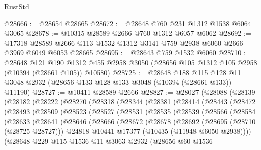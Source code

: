 \begin{lexlean}{RustStd}
\begin{coremodule}
@28666 := @28654 @28665
@28672 := @28648 @760 @231 @1312 @1538 @6064 @3065
@28678 := @10315 @28589 @2666 @760 @1312 @6057 @6062
@28692 := @17318 @28589 @2666 @113 @1532 @1312 @3141 @759 @2938 @6060 @2666 @3969 @6049 @6053 @28665
@28695 := @28643 @759 @1532 @6060
@28710 := @28648
    @121
    @190
    @1312
    @455
    @2958
    @3050
    (@28656 @105 @1312 @105 @2958 (@10394 (@28661 @105)) @10580)
@28725 := @28648
    @188
    @115
    @128
    @11
    @3048
    @2932
    (@28656 @133 @128 @133 @3048 (@10394 (@28661 @133)) @11190)
@28727 := @10411 @28589 @2666
@28827 := @28027
    (@28088
      (@28139
        (@28182
          (@28222
            (@28270
              (@28318
                (@28344
                  (@28381
                    (@28414
                      (@28443
                        (@28472
                          (@28493
                            (@28509
                              (@28523
                                (@28527
                                  (@28531
                                    (@28535
                                      (@28539
                                        (@28566
                                          (@28584
                                            (@28633
                                              (@28641
                                                (@28646
                                                  (@28666
                                                    (@28672
                                                      (@28678
                                                        (@28692
                                                          (@28695 (@28710 (@28725 @28727)))
                                                          @24818
                                                          @10441
                                                          @17377
                                                          (@10435 (@11948 @6050 @2938))))
                                                      (@28648
                                                        @229
                                                        @115
                                                        @1536
                                                        @11
                                                        @3063
                                                        @2932
                                                        (@28656
                                                          @60
                                                          @1536

\end{coremodule}
\end{lexlean}

